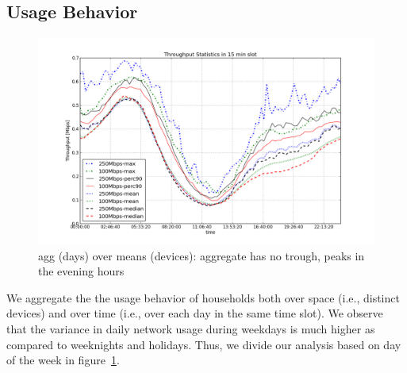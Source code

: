 \subsection{Usage Behavior}
\label{subsec:behavior}



\begin{figure}[ht!]
\begin{minipage}{\linewidth}
  \centering
  \includegraphics[width=\linewidth]{figures/describe-total-throughput-per-day[replace].png}
  \caption{agg (days) over means (devices): aggregate has no trough, peaks in the evening hours}
  \label{fig:TS-data-rate-daily}
\end{minipage}
\end{figure}

We aggregate the the usage behavior of households both over space (i.e., distinct devices) and over time (i.e., over each day in the same time slot). We observe that the variance in daily network usage during weekdays is much higher as compared to weeknights and holidays. Thus, we divide our analysis based on day of the week in figure~\ref{fig:TS-data-rate-daily}. 

